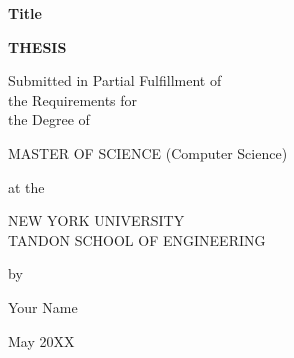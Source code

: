 \documentclass[12pt,letterpaper]{report}
\newcommand{\thesistitle}{Title}
\newcommand{\thesisauthor}{Your Name}
\newcommand{\graddate}{May 20XX} %
\begin{document}



\thispagestyle{empty}
\begin{center}
{\bfseries 
  {\large\thesistitle}
  \vspace{1in}
  
 {\large {\bf THESIS}}\\
  \vspace{.5in}
  
  \begin{doublespace}
  {\large  
  Submitted in Partial Fulfillment of\\
  the Requirements for\\
  the Degree of\\}
  \end{doublespace}
  \vspace{.5in}
  
  {\large MASTER OF SCIENCE (Computer Science)}\\
  \vspace{.5in}
  
  at the \\
  \vspace{.2in}
  
  {\large
  NEW YORK UNIVERSITY\\
  \vspace{-0.05in}
  TANDON SCHOOL OF ENGINEERING\\
  }
  \vspace{.2in}
  
  by
  \vspace{.5in}

  {\large\thesisauthor}
  \vspace{.5in}

  {\large\graddate}
}

\end{center}

\newpage
\end{document}
